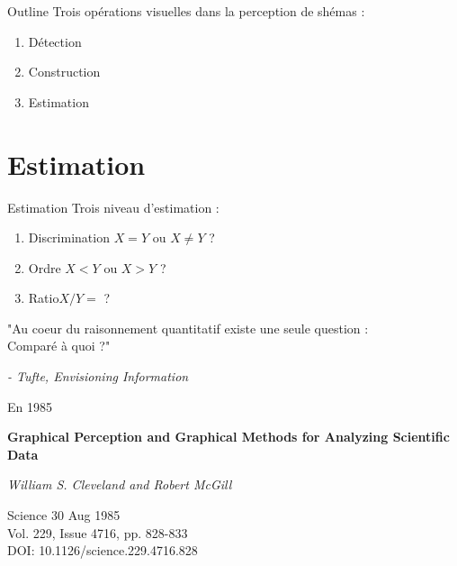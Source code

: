 \documentclass[french]{beamer}
\begin{document}
 \begin{frame}{Outline}
Trois opérations visuelles dans la perception de shémas : 
\begin{enumerate}
	\item Détection
	\item Construction
	\item Estimation
\end{enumerate}
\end{frame}

\section{Estimation}

 \begin{frame}{Estimation}
Trois niveau d'estimation : 
\begin{enumerate}
	\item Discrimination \hfill $X = Y$ ou $X \neq Y$ ?
	\item Ordre \hfill $X < Y$ ou $X > Y$ ?
	\item Ratio\hfill $X / Y = $ ?
\end{enumerate}
\end{frame}

\begin{frame}{}
\begin{large}
		"Au coeur du raisonnement quantitatif existe une seule question : \\
		Comparé à quoi ?"
		
\vspace{1cm}
\textit{- Tufte, Envisioning Information}
\end{large}
\end{frame}

 \begin{frame}{En 1985}
\begin{large}
\textbf{Graphical Perception and Graphical Methods for Analyzing Scientific Data}

\vspace{0.7cm}
\textit{William S. Cleveland and Robert McGill}

\vspace{1cm}
Science 30 Aug 1985\\
Vol. 229, Issue 4716, pp. 828-833\\
DOI: 10.1126/science.229.4716.828
\end{large}
\end{frame}
\end{document}
